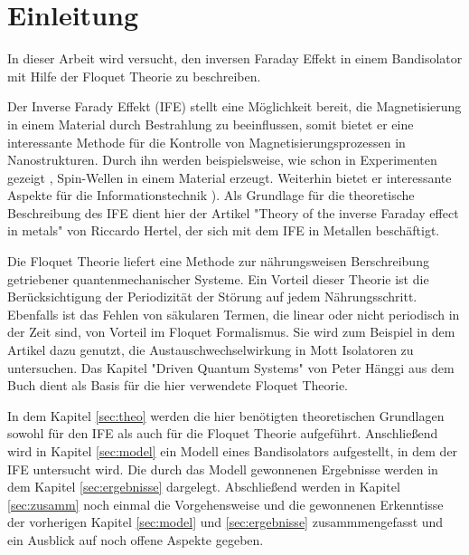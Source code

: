 \chapter{Einleitung}
In dieser Arbeit wird versucht,
den inversen Faraday Effekt
in einem Bandisolator mit
Hilfe der Floquet Theorie
zu beschreiben.

Der Inverse Farady Effekt (IFE) stellt eine Möglichkeit bereit,
die Magnetisierung in einem Material
durch Bestrahlung zu beeinflussen,
somit bietet er eine interessante
Methode für die
Kontrolle von Magnetisierungsprozessen
 in Nanostrukturen.
Durch ihn werden beispielsweise, wie schon
in Experimenten gezeigt \cite{jackl},
Spin-Wellen in einem Material erzeugt.
Weiterhin bietet er interessante
Aspekte für die Informationstechnik \cite{hertel}).
Als Grundlage für die
theoretische Beschreibung des IFE dient hier
der Artikel "Theory of the inverse Faraday effect
in metals" \cite{hertel} von Riccardo
Hertel, der sich mit dem IFE in Metallen
beschäftigt.

Die Floquet Theorie liefert eine Methode
zur nährungsweisen Berschreibung
getriebener quantenmechanischer Systeme.
Ein Vorteil dieser Theorie ist
die Berücksichtigung der Periodizität
der Störung auf jedem Nährungsschritt.
Ebenfalls ist das Fehlen von
säkularen Termen, die linear oder nicht
periodisch in der Zeit sind, von Vorteil
im Floquet Formalismus.\cite{haenggi}
Sie wird zum Beispiel in dem Artikel \cite{mentink}
dazu genutzt, die Austauschwechselwirkung
in Mott Isolatoren zu untersuchen.
Das Kapitel
"Driven Quantum Systems"
von Peter Hänggi aus dem Buch \cite{haenggi}
dient als Basis für die hier verwendete Floquet Theorie.


In dem Kapitel \ref{sec:theo} werden die
hier benötigten theoretischen Grundlagen
sowohl für den IFE als auch für die Floquet Theorie aufgeführt.
Anschließend wird in Kapitel \ref{sec:model} ein
Modell eines Bandisolators aufgestellt,
in dem der IFE untersucht wird.
Die durch das Modell gewonnenen Ergebnisse
werden in dem Kapitel \ref{sec:ergebnisse} dargelegt.
Abschließend werden in Kapitel \ref{sec:zusamm}
noch einmal die Vorgehensweise
und die gewonnenen Erkenntisse der vorherigen
Kapitel \ref{sec:model} und \ref{sec:ergebnisse}
zusammmengefasst und ein Ausblick
auf noch offene Aspekte gegeben.


